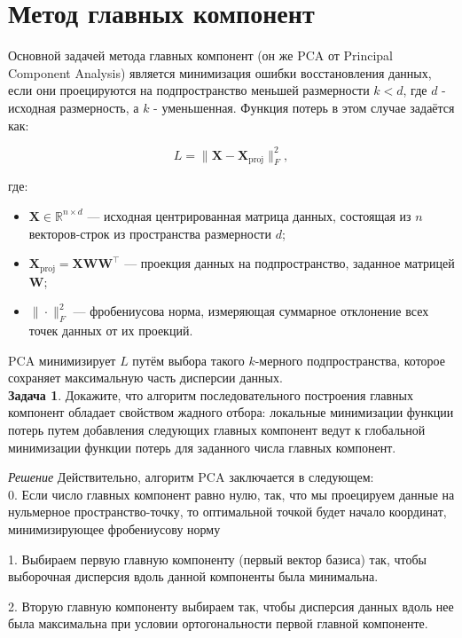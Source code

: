 \section{Метод главных компонент}


Основной задачей метода главных компонент (он же PCA от Principal Component Analysis)  является минимизация ошибки восстановления данных, если они проецируются на подпространство меньшей размерности $k<d$, где $d$ - исходная размерность, а $k$ - уменьшенная. Функция потерь в этом случае задаётся как:

\[
L = \| \mathbf{X} - \mathbf{X}_{\text{proj}} \|_F^2,
\]

где:

\begin{itemize}
    \item \( \mathbf{X} \in \mathbb{R}^{n \times d} \) — исходная центрированная матрица данных, состоящая из $n$ векторов-строк из пространства размерности $d$;
    \item \( \mathbf{X}_{\text{proj}} = \mathbf{X} \mathbf{W} \mathbf{W}^\top \) — проекция данных на подпространство, заданное матрицей \( \mathbf{W} \);
    \item \( \| \cdot \|_F^2 \) — фробениусова норма, измеряющая суммарное отклонение всех точек данных от их проекций.
\end{itemize}

PCA минимизирует \( L \) путём выбора такого \( k \)-мерного подпространства, которое сохраняет максимальную часть дисперсии данных. \\

\textbf{Задача 1}. Докажите, что алгоритм последовательного построения главных компонент обладает свойством жадного отбора: локальные минимизации функции потерь путем добавления следующих главных компонент ведут к глобальной минимизации функции потерь для заданного числа главных компонент. 

\textit{Решение}
Действительно, алгоритм PCA заключается в следующем:\\

0. Если число главных компонент равно нулю, так, что мы проецируем данные на нульмерное пространство-точку, то оптимальной точкой будет начало координат, минимизирующее фробениусову норму

1. Выбираем первую главную компоненту (первый вектор базиса) так, чтобы выборочная дисперсия вдоль данной компоненты была минимальна. 

2. Вторую главную компоненту выбираем так, чтобы дисперсия данных вдоль нее была максимальна при условии ортогональности первой главной компоненте.

